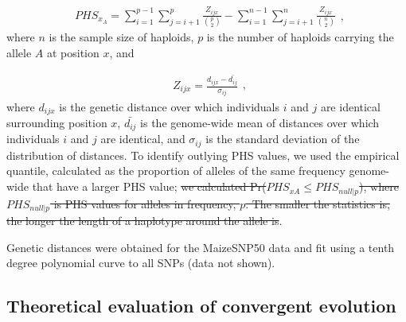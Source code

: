 \begin{equation}
  \label{phs-1}
  \begin{array}{l}
  \displaystyle{
PHS_{x_A} = \sum^{p-1}_{i=1}\sum^{p}_{j=i+1} \frac{ Z_{ijx} }{ {p \choose 2} } - \sum^{n-1}_{i=1}\sum^{n}_{j=i+1} \frac{ Z_{ijx}  }{ {n \choose 2}}
  }
  \end {array} 
  \textrm{,}
\end{equation}
\noindent where $n$ is the sample size of haploids, $p$  is the number of haploids carrying the allele $A$ at position $x$, and

\begin{equation}
  \label{phs-2}
  \begin{array}{l}
  \displaystyle{
Z_{ijx} = \frac{ d_{ijx} - \bar{d_{ij}} }{ \sigma_{ij} }
  }
  \end {array} 
  \textrm{,}
\end{equation}
\noindent where $d_{ijx}$ is the genetic distance over which individuals $i$ and $j$ are identical surrounding position $x$, 
$\bar{d_{ij}}$ is the genome-wide mean of distances over which individuals $i$ and $j$ are identical, 
and $\sigma_{ij}$ is the standard deviation of the distribution of distances.  
To identify outlying PHS values, we used the empirical quantile, calculated as the proportion of alleles of the same frequency genome-wide that have a larger PHS value; \st{we calculated Pr($PHS_{xA}\leq PHS_{null|p}$), where $PHS_{null|p}$ is PHS values for alleles in frequency, $p$.  The smaller the statistics is, the longer the length of a haplotype around the allele is}.

Genetic distances were obtained for the MaizeSNP50 data \citep{Ganal_2011_22174790} and fit using a tenth degree polynomial curve to all SNPs (data not shown).

\subsection*{Theoretical evaluation of convergent evolution }

